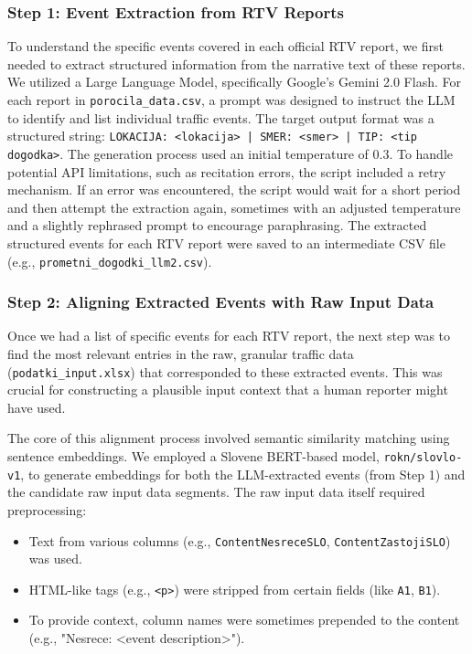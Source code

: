 \documentclass[fleqn,moreauthors,10pt]{ds_report}
\begin{document}
\subsubsection*{Step 1: Event Extraction from RTV Reports}
To understand the specific events covered in each official RTV report, we first needed to extract structured information from the narrative text of these reports. We utilized a Large Language Model, specifically Google's Gemini 2.0 Flash.
For each report in \texttt{porocila\_data.csv}, a prompt was designed to instruct the LLM to identify and list individual traffic events. The target output format was a structured string: \texttt{LOKACIJA: <lokacija> | SMER: <smer> | TIP: <tip dogodka>}. 
The generation process used an initial temperature of 0.3. To handle potential API limitations, such as recitation errors, the script included a retry mechanism. If an error was encountered, the script would wait for a short period and then attempt the extraction again, sometimes with an adjusted temperature and a slightly rephrased prompt to encourage paraphrasing. The extracted structured events for each RTV report were saved to an intermediate CSV file (e.g., \texttt{prometni\_dogodki\_llm2.csv}).

\subsubsection*{Step 2: Aligning Extracted Events with Raw Input Data}
Once we had a list of specific events for each RTV report, the next step was to find the most relevant entries in the raw, granular traffic data (\texttt{podatki\_input.xlsx}) that corresponded to these extracted events. This was crucial for constructing a plausible input context that a human reporter might have used.

The core of this alignment process involved semantic similarity matching using sentence embeddings. We employed a Slovene BERT-based model, \texttt{rokn/slovlo-v1}, to generate embeddings for both the LLM-extracted events (from Step 1) and the candidate raw input data segments. The raw input data itself required preprocessing:
\begin{itemize}
    \item Text from various columns (e.g., \texttt{ContentNesreceSLO}, \texttt{ContentZastojiSLO}) was used.
    \item HTML-like tags (e.g., \texttt{<p>}) were stripped from certain fields (like \texttt{A1}, \texttt{B1}).
    \item To provide context, column names were sometimes prepended to the content (e.g., "Nesrece: <event description>").
\end{itemize}
\end{document}
